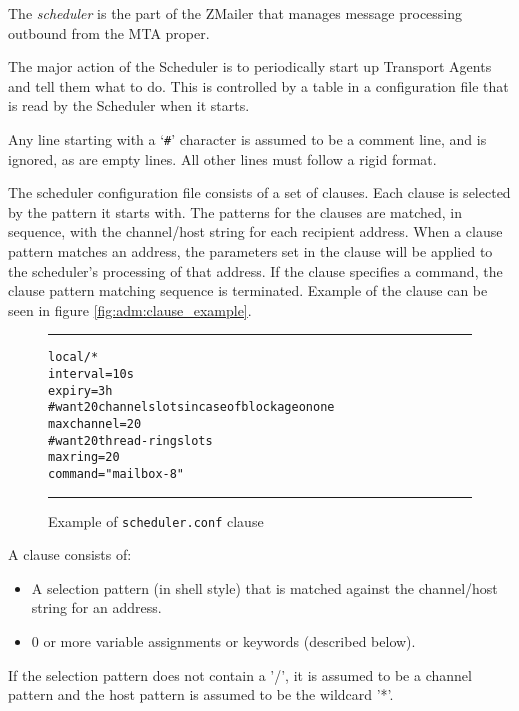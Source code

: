
The {\em scheduler} is the part of the ZMailer that manages
message processing outbound from the MTA proper.


The major action of the Scheduler is to periodically start up Transport
Agents and tell them what to do.  This is controlled by a table in a
configuration file that is read by the Scheduler when it starts.  

Any line starting with a `{\tt \#}' character is assumed to be a comment 
line, and is ignored, as are empty lines.  All other lines must follow a rigid
format. 

The scheduler configuration file consists of a set  of
clauses. Each clause is selected by the pattern it starts
with. The patterns  for  the  clauses   are  matched,  in
sequence, with the channel/host string for each recipient
address. When a clause pattern matches  an  address,  the
parameters set in the clause will be applied to the scheduler's 
processing of that address. If the clause specifies a command,  
the clause pattern matching sequence is terminated.
Example of the clause can be seen in figure \vref{fig:adm:clause_example}.

\begin{figure*}
\begin{alltt}\hrule\medskip
local/*
        interval=10s
        expiry=3h
        # want 20 channel slots in case of blockage on one
        maxchannel=20
        # want 20 thread-ring slots
        maxring=20
        command="mailbox -8"
\medskip\hrule\end{alltt}\medskip
\caption{\label{fig:adm:clause_example}Example of {\tt scheduler.conf} clause}
\end{figure*}

A clause consists of:

\begin{itemize}
\item A selection pattern  (in  shell style) that  is
matched  against        the  channel/host  string  for an
address.
\item 0  or more  variable assignments or keywords
(described below).
\end{itemize}


If the selection pattern does not contain a '/', it is
assumed to be a channel pattern and the host  pattern  is
assumed to be the wildcard '*'.

